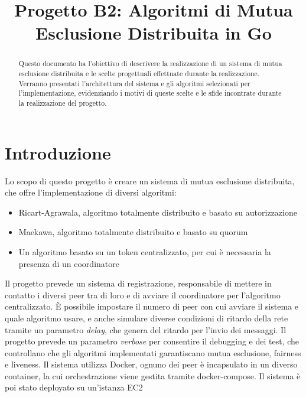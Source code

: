 \documentclass[conference]{IEEEtran}
\begin{document}
\title{Progetto B2: Algoritmi di Mutua Esclusione Distribuita in Go\\}

\author{
}

\maketitle

\begin{abstract}
Questo documento ha l'obiettivo di descrivere la realizzazione di un sistema di mutua esclusione distribuita e le scelte progettuali effettuate durante la realizzazione.
Verranno presentati l'architettura del sistema e gli algoritmi selezionati per l'implementazione, evidenziando i motivi di queste scelte e le sfide incontrate durante la realizzazione del progetto. 
\end{abstract}


\section{Introduzione}
Lo scopo di questo progetto è creare un sistema di mutua esclusione distribuita, che offre l'implementazione di diversi algoritmi:
\begin{itemize}
\item Ricart-Agrawala, algoritmo totalmente distribuito e basato su autorizzazione
\item Maekawa, algoritmo totalmente distribuito e basato su quorum
\item Un algoritmo basato su un token centralizzato, per cui è necessaria la presenza di un coordinatore
\end{itemize}
Il progetto prevede un sistema di registrazione, responsabile di mettere in contatto i diversi peer tra di loro e di avviare il coordinatore per l'algoritmo centralizzato.
\`E possibile impostare il numero di peer con cui avviare il sistema e quale algoritmo usare, e anche simulare diverse condizioni di ritardo della rete tramite un parametro \textit{delay}, che genera del ritardo per l'invio dei messaggi.
Il progetto prevede un parametro \textit{verbose} per consentire il debugging e dei test, che controllano che gli algoritmi implementati garantiscano mutua esclusione, fairness e liveness. Il sistema utilizza Docker, ognuno dei peer è incapsulato in un diverso container, la cui orchestrazione viene gestita tramite docker-compose. Il sistema è poi stato deployato su un'istanza EC2
\end{document}
